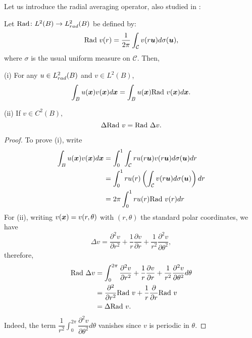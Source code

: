 \documentclass[11pt,a4paper]{article}
\begin{document}
Let us introduce the radial averaging operator, also studied in \cite{SphericalAverage}:  
\begin{Lem} \label{RadialAveraging}
	Let $\textup{Rad}\colon L^2(B) \to L^2_{rad}(B)$ be defined by:
	\[{\mathop\textup{Rad }} v(r) = \frac{1}{2\pi} \int_{\mathcal{C}} v(r\boldsymbol{u})d\sigma(\boldsymbol{u}),\]
	where $\sigma$ is the usual uniform measure on $\mathcal{C}$. Then, 
	\item[(i)] For any $u \in L^2_{rad}(B)$ and $v \in L^2(B)$,
	\[ \int_{B} u(\boldsymbol{x})v(\boldsymbol{x})d\boldsymbol{x} = \int_B u(\boldsymbol{x}){\mathop\textup{Rad }} v(\boldsymbol{x})d\boldsymbol{x}.\]
	\item[(ii)] If $v \in C^{2}(B),$
	\[ \Delta\textup{Rad }v   = \textup{Rad }\Delta v.\]
	\begin{proof}
		To prove (i), write
		\begin{equation}
			\begin{split}
				\int_{B}u(\boldsymbol{x}) v(\boldsymbol{x}) d\boldsymbol{x} &= \int_{0}^{1} \int_{\mathcal{C}}r u(r \boldsymbol{u}) v(r\boldsymbol{u})d\sigma(\boldsymbol{u})dr\\
				&=\int_{0}^1 r u(r)\left( \int_{\mathcal{C}} v(r\boldsymbol{u})d\sigma(\boldsymbol{u})\right) dr\\
				&=2\pi \int_{0}^{1} r u(r) \textup{Rad }v(r) dr\\
			\end{split}
		\end{equation}	
		For (ii), writing $v(\boldsymbol{x}) = v(r,\theta)$ with $(r,\theta)$ the standard polar coordinates, we have
		\[ \Delta v = \dfrac{\partial^2v}{\partial r^2} + \dfrac{1}{r} \dfrac{\partial v}{\partial r} + \dfrac{1}{r^2}\dfrac{\partial^2 v}{\partial \theta^2},\]
		therefore, 
		\begin{equation}
			\begin{split}
				\textup{Rad } \Delta v &= \int_{0}^{2\pi} \dfrac{\partial^2v}{\partial r^2} + \dfrac{1}{r} \dfrac{\partial v}{\partial r} + \dfrac{1}{r^2}\dfrac{\partial^2 v}{\partial \theta^2} d\theta\\
				&= \dfrac{\partial^2}{\partial r^2} \textup{Rad } v + \dfrac{1}{r}\dfrac{\partial }{\partial r} \textup{Rad }v \\
				&= \Delta \textup{Rad } v.
			\end{split}
		\end{equation}
		Indeed, the term $\dfrac{1}{r^2}\displaystyle\int_{0}^{2\pi} \dfrac{\partial^2 v}{\partial \theta^2} d\theta$ vanishes since $v$ is periodic in $\theta$. \qedhere
	\end{proof}
\end{Lem}
\end{document}
